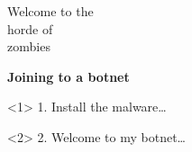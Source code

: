 {
\begin{frame}[plain]
    \Huge\bfseries
    \vspace{2cm}
    \color{white}
    \begin{minipage}{.7\textwidth}
      Welcome to the\\ horde of\\ zombies
    \end{minipage}
\end{frame}
}

\begin{frame}[plain]
  \begin{center}
    \LARGE\bfseries
    Joining to a botnet
  \end{center}

  \vspace{.5cm}

  \begin{onlyenv}<1>
    1. Install the malware\ldots
    \begin{center}
    \end{center}
  \end{onlyenv}

  \begin{onlyenv}<2>
    2. Welcome to my botnet\ldots
    \begin{center}
    \end{center}
  \end{onlyenv}

\end{frame}
